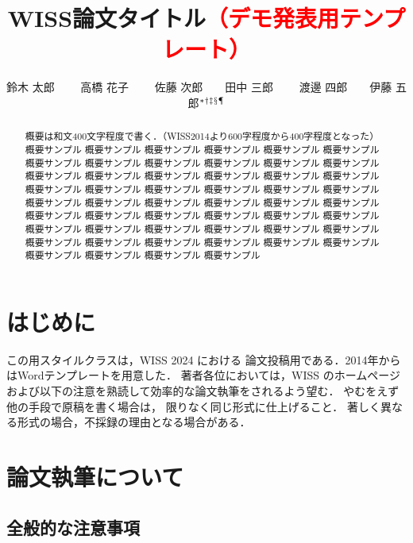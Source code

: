 \documentclass[twoside]{wiss}
\begin{document}
\title{WISS論文タイトル\textcolor{red}{（デモ発表用テンプレート）}}
\etitle{}%
%
%
%
\author{鈴木 太郎 　　高橋 花子
　　佐藤 次郎　　田中 三郎
　　渡邊 四郎　　伊藤 五郎${}^* {}^\dag {}^\ddag {}^\mathsection
{}^\mathparagraph$}

\begin{abstract}
概要は和文400文字程度で書く．（WISS2014より600字程度から400字程度となった）
概要サンプル 概要サンプル 概要サンプル 概要サンプル 概要サンプル 概要サンプル
概要サンプル 概要サンプル 概要サンプル 概要サンプル 概要サンプル 概要サンプル
概要サンプル 概要サンプル 概要サンプル 概要サンプル 概要サンプル 概要サンプル
概要サンプル 概要サンプル 概要サンプル 概要サンプル 概要サンプル 概要サンプル
概要サンプル 概要サンプル 概要サンプル 概要サンプル 概要サンプル 概要サンプル
概要サンプル 概要サンプル 概要サンプル 概要サンプル 概要サンプル 概要サンプル
概要サンプル 概要サンプル 概要サンプル 概要サンプル 概要サンプル 概要サンプル
概要サンプル 概要サンプル 概要サンプル 概要サンプル 概要サンプル 概要サンプル
概要サンプル 概要サンプル 概要サンプル 概要サンプル
\end{abstract}

\maketitle

\section{はじめに}

この\LaTeXe{}用スタイルクラスは，WISS 2024 における
論文投稿用である．2014年からはWordテンプレートを用意した．
著者各位においては，WISS のホームページ\cite{wiss}
および以下の注意を熟読して効率的な論文執筆をされるよう望む．
やむをえず他の手段で原稿を書く場合は，
限りなく同じ形式に仕上げること．
著しく異なる形式の場合，不採録の理由となる場合がある．

\section{論文執筆について}

\subsection{全般的な注意事項}
\end{document}

